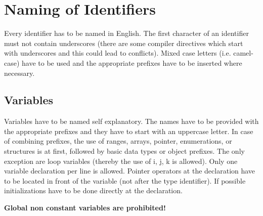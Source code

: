 \documentclass[final,a4paper,10pt, oneside]{article}
\begin{document}
\section{Naming of Identifiers}
Every identifier has to be named in English. 
The first character of an identifier must not contain underscores (there are some compiler directives which start with underscores and this could lead to conflicts). 
Mixed case letters (i.e. camel-case) have to be used and the appropriate prefixes have to be inserted where necessary.


\subsection{Variables}
Variables have to be named self explanatory. The names have to be provided with the appropriate prefixes and they have to start with an uppercase letter. In case of combining prefixes, the use of ranges, arrays, pointer, enumerations, or structures is at first, followed by basic data types or object prefixes. The only exception are loop variables (thereby the use of i, j, k is allowed). Only one variable declaration per line is allowed. Pointer operators at the declaration have to be located in front of the variable (not after the type identifier). If possible initializations have to be done directly at the declaration.

\textbf{Global non constant variables are prohibited!}
\end{document}
